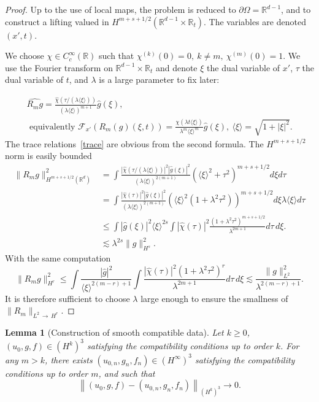 \documentclass[10pt]{amsart}
\newtheorem{lemm}[theo]{Lemma}\newtheorem{prop}[theo]{Proposition}\newtheorem{coro}[theo]{Corollary}\newtheorem{conj}[theo]{Conjecture}
\theoremstyle{definition}\newtheorem{defi}[theo]{Definition}\newtheorem{rema}[theo]{Remark}\newtheorem{exam}[theo]{Example}\newtheorem{exem}[theo]{Example}\newtheorem{nota}[theo]{Notation}
\newcommand{\R}{\mathbb{R}}
\newcommand{\clF}{\mathcal{F}}
\newcommand{\cxi}{\langle \xi\rangle}
\begin{document}
\begin{proof}
Up to the use of local maps, the problem is reduced to $\partial\Omega=\R^{d-1}$, and to construct a lifting valued in $H^{m+s+1/2}(\R^{d-1}\times \R_t)$. The variables are denoted $(x',t)$.


We choose $\chi\in C_c^\infty(\R)$ such that $\chi^{(k)}(0)=0,\ k\neq m,\ \chi^{(m)}(0)=1$. We use the Fourier transform on $\R^{d-1}\times \R_t$ and denote $\xi$ the dual variable of $x'$, $\tau$ the dual variable of $t$, and $\lambda$ is a large parameter to fix later:

\begin{multline*}
\widehat{R_mg}=\frac{\widehat{\chi}(\tau/(\lambda\langle \xi\rangle))}{(\lambda \cxi)^{m+1}}\widehat{g}(\xi),\\
\text{ equivalently }
\clF_{x'}\left(R_m(g) (\xi,t)\right)=\frac{\chi(\lambda t\langle \xi\rangle)}{\lambda^{m}\langle \xi\rangle^{m}}\widehat{g}(\xi),\
\cxi=\sqrt{1+|\xi|^2}.
\end{multline*}
The trace relations~\eqref{trace} are obvious from the second formula. The $H^{m+s+1/2}$ norm is easily bounded
\begin{align*}
\|R_mg\|_{H^{m+s+1/2}(\R^d)}^2&=\int \frac{\left|\widehat{\chi}(\tau/(\lambda\langle \xi\rangle))\right|^2|\widehat{g} (\xi)|^2} {(\lambda \cxi)^{2(m+1)}}\left(\cxi^2+\tau^2\right)^{m+s+1/2}d\xi d\tau
\\
&=\int \frac{\left|\widehat{\chi}(\tau)\right|^2|\widehat{g}(\xi)|^2}{(\lambda \cxi)^{2(m+1)}} \left(\cxi^2\left(1+\lambda^2\tau^2\right)\right)^{m+s+1/2} d\xi \lambda \cxi d\tau
\\
&\leq \int \left|\widehat{g}(\xi)\right|^2\cxi^{2s}
\int\left|\widehat{\chi}(\tau)\right|^2
\frac{\left(1+\lambda^2\tau^2\right)^{m+s+1/2}}{\lambda^{2m+1}}d\tau\,d\xi.
\\
&\lesssim \lambda^{2s}\|g\|_{H^{s}}^2.
\end{align*}
With the same computation
\[
\|R_mg\|_{H^r}^2\leq
\int \frac{|\widehat{g}|^2}{\cxi^{2(m-r)+1}}\int \frac{|\widehat{\chi}(\tau)|^2\left(1+\lambda^2
\tau^2\right)^r}{\lambda^{2m+1}}d\tau\,d\xi\lesssim
\frac{\|g\|_{L^2}^2}{\lambda^{2(m-r)+1}}.
\]
It is therefore sufficient to choose $\lambda$ large enough to ensure the smallness of\\$\|R_m\|_{L^2\,\to\,H^r}$.
\end{proof}

\begin{lemm}[Construction of smooth compatible data]\label{compahaute}
Let $k\geq 0$, $(u_0,g,f)\in (H^k)^3$ satisfying the compatibility conditions up to order $k$. For any $m>k$, there exists $(u_{0,n},g_n,f_n)\in (H^\infty)^3$ satisfying the compatibility conditions up to order $m$, and such that
\[
\left\|(u_0,g,f)-(u_{0,n},g_n,f_n)\right\|_{(H^k)^3}
\to 0.
\]
\end{lemm}
\end{document}
